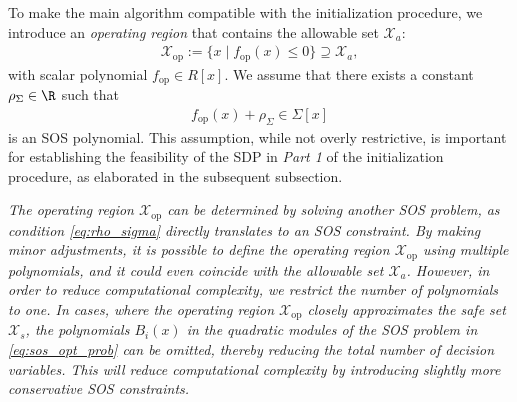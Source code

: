 To make the main algorithm compatible with the initialization procedure, we introduce an \emph{operating region} that contains the allowable set $\mathcal X_a$:
\begin{align} \label{eq:radius_of_interest}
   \mathcal X_\text{op} := \{ x \mid f_\text{op}(x) \leq 0 \} \supseteq \mathcal X_a,
\end{align}
with scalar polynomial $f_\text{op} \in R[x]$.
We assume that there exists a constant $\rho_\Sigma \in \R$ such that 
\begin{align} \label{eq:rho_sigma}
   f_\text{op}(x) + \rho_\Sigma \in \Sigma[x]
\end{align}
is an SOS polynomial.
This assumption, while not overly restrictive, is important for establishing the feasibility of the SDP in \textit{Part 1} of the initialization procedure, as elaborated in the subsequent subsection.

\begin{remark}
   \textit{
      The operating region $\mathcal X_\text{op}$ can be determined by solving another SOS problem, as condition \cref{eq:rho_sigma} directly translates to an SOS constraint.
      By making minor adjustments, it is possible to define the operating region $\mathcal X_\text{op}$ using multiple polynomials, and it could even coincide with the allowable set $\mathcal X_a$.
      However, in order to reduce computational complexity, we restrict the number of polynomials to one.
      In cases, where the operating region $\mathcal X_\text{op}$ closely approximates the safe set $\mathcal X_s$, the polynomials $B_i(x)$ in the quadratic modules of the SOS problem in \cref{eq:sos_opt_prob} can be omitted, thereby reducing the total number of decision variables.
      This will reduce computational complexity by introducing slightly more conservative SOS constraints.
   }
\end{remark}

